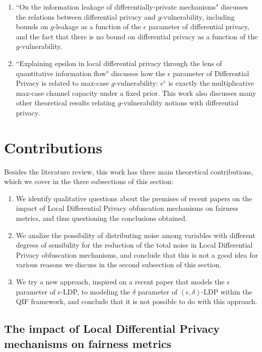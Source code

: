\documentclass[conference]{IEEEtran}
\newcommand{\qm}[1]{``#1"}
\begin{document}
\begin{enumerate}
	\item \qm{On the information leakage of differentially-private mechanisms} \cite{alvim2015information} discusses the relations between differential privacy and $g$-vulnerability, including bounds on $g$-leakage as a function of the $\epsilon$ parameter of differential privacy, and the fact that there is no bound on differential privacy as a function of the $g$-vulnerability.
	\item \qm{Explaining epsilon in local differential privacy through the lens of quantitative information flow} \cite{fernandes2022explaining} discusses how the $\epsilon$ parameter of Differential Privacy is related to max-case $g$-vulnerability: $e^\epsilon$ is exactly the multiplicative max-case channel capacity under a fixed prior. This work also discusses many other theoretical results relating $g$-vulnerability notions with differential privacy.
\end{enumerate}

\section{Contributions}
Besides the literature review, this work has three main theoretical contributions, which we cover in the three subsections of this section:

\begin{enumerate}
	\item We identify qualitative questions about the premises of recent papers on the impact of Local Differential Privacy obfuscation mechanisms on fairness metrics, and thus questioning the conclusions obtained.
	\item We analize the possibility of distributing noise among variables with different degrees of sensibility for the reduction of the total noise in Local Differential Privacy obfuscation mechanisms, and conclude that this is not a good idea for various reasons we discuss in the second subsection of this section.
	\item We try a new approach, inspired on a recent paper \cite{fernandes2022explaining} that models the $\epsilon$ parameter of $\epsilon$-LDP, to modeling the $\delta$ parameter of $(\epsilon, \delta)$-LDP within the QIF framework, and conclude that it is not possible to do with this approach.
\end{enumerate}

\subsection{The impact of Local Differential Privacy mechanisms on fairness metrics}\label{subsec:ldpunfair}
\end{document}
